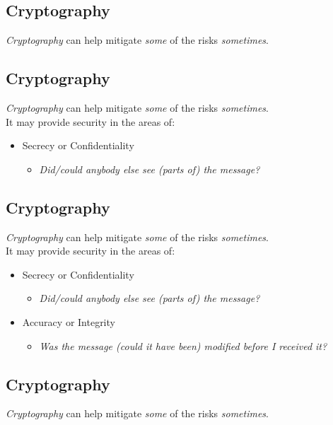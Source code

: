 \documentclass[xga]{xdvislides}
\begin{document}
\subsection{Cryptography}
\Normalsize
{\em Cryptography} can help mitigate {\em some} of the risks {\em sometimes}.

\subsection{Cryptography}
{\em Cryptography} can help mitigate {\em some} of the risks {\em sometimes}.
\\

It may provide security in the areas of:
\begin{itemize}
	\item Secrecy or Confidentiality
		\begin{itemize}
			\item {\em Did/could anybody else see (parts of) the message?}
		\end{itemize}
\end{itemize}

\subsection{Cryptography}
{\em Cryptography} can help mitigate {\em some} of the risks {\em sometimes}.
\\

It may provide security in the areas of:
\begin{itemize}
	\item Secrecy or Confidentiality
		\begin{itemize}
			\item {\em Did/could anybody else see (parts of) the message?}
		\end{itemize}
	\item Accuracy or Integrity
		\begin{itemize}
			\item {\em Was the message (could it have been) modified before I received it?}
		\end{itemize}
\end{itemize}

\subsection{Cryptography}
{\em Cryptography} can help mitigate {\em some} of the risks {\em sometimes}.
\\
\end{document}
